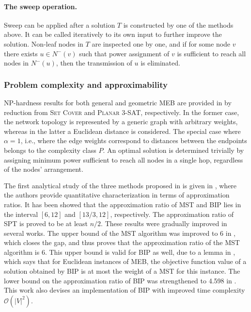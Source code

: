 \paragraph{The sweep operation.}
Sweep can be applied after a solution $T$ is constructed by one of the methods above.
It can be called iteratively to its own input to further improve the solution.
Non-leaf nodes in $T$ are inspected one by one, and if for some node $v$ there exists $u\in N^-(v)$ such that power assignment of $v$ is sufficient to reach all nodes in $N^-(u)$, 
then the transmission of $u$ is eliminated.

\subsubsection{Problem complexity and approximability}

NP-hardness results for both general and geometric MEB are provided in \cite{cagalj02} by reduction from \textsc{Set Cover} and \textsc{Planar 3-SAT}, respectively.
In the former case, the network topology is represented by a generic graph with arbitrary weights, whereas in the latter a Euclidean distance is considered.
The special case where $\alpha=1$, i.e., where the edge weights correspond to distances between the endpoints belongs to the complexity class $P$.
An optimal solution is determined trivially by assigning minimum power sufficient to reach all nodes in a single hop, regardless of the nodes' arrangement.

The first analytical study of the three methods proposed in \cite{wieselthier00} is given in \cite{wan02}, where the authors provide quantitative characterization in terms of approximation ratios.
It has been showed that the approximation ratio of MST and BIP lies in the interval $\left[6,12\right]$ and $\left[13/3,12\right]$, respectively.
The approximation ratio of SPT is proved to be at least $n/2$.
These results were gradually improved in several works. 
The upper bound of the MST algorithm was improved to 6 in \cite{ambuhl05}, which closes the gap, and thus proves that the approximation ratio of the MST algorithm is 6. %
This upper bound is valid for BIP as well, due to a lemma in \cite{wan02},
which says that for Euclidean instances of MEB, the objective function value of a solution obtained by BIP is at most the weight of a MST for this instance.
The lower bound on the approximation ratio of BIP was strengthened to 4.598 in \cite{bauer09}. 
This work also devises an implementation of BIP with improved time complexity $\mathcal{O}(|V|^2)$.

